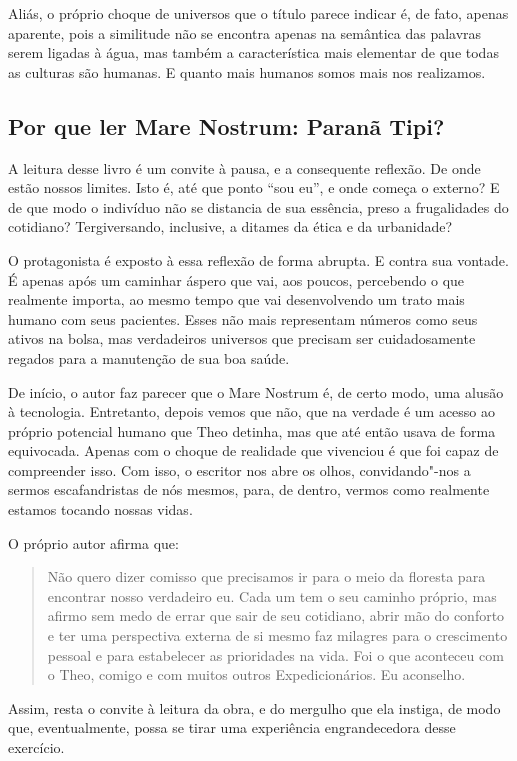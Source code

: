 \documentclass[12pt]{extarticle}
\begin{document}
Aliás, o próprio choque de universos que o título parece indicar é, de
fato, apenas aparente, pois a similitude não se encontra apenas na
semântica das palavras serem ligadas à água, mas também a característica
mais elementar de que todas as culturas são humanas. E quanto mais
humanos somos mais nos realizamos.

\subsection{Por que ler Mare Nostrum: Paranã Tipi?}

A leitura desse livro é um convite à pausa, e a consequente reflexão. De
onde estão nossos limites. Isto é, até que ponto ``sou eu'', e onde
começa o externo? E de que modo o indivíduo não se distancia de sua
essência, preso a frugalidades do cotidiano? Tergiversando, inclusive, a
ditames da ética e da urbanidade?

O protagonista é exposto à essa reflexão de forma abrupta. E contra sua
vontade. É apenas após um caminhar áspero que vai, aos poucos,
percebendo o que realmente importa, ao mesmo tempo que vai desenvolvendo
um trato mais humano com seus pacientes. Esses não mais representam
números como seus ativos na bolsa, mas verdadeiros universos que
precisam ser cuidadosamente regados para a manutenção de sua boa saúde.

De início, o autor faz parecer que o Mare Nostrum é, de certo modo, uma
alusão à tecnologia. Entretanto, depois vemos que não, que na verdade é
um acesso ao próprio potencial humano que Theo detinha, mas que até
então usava de forma equivocada. Apenas com o choque de realidade que
vivenciou é que foi capaz de compreender isso. Com isso, o escritor nos
abre os olhos, convidando"-nos a sermos escafandristas de nós mesmos,
para, de dentro, vermos como realmente estamos tocando nossas vidas.

O próprio autor afirma que:

\begin{quote}
Não quero dizer comisso que precisamos ir para o meio da floresta para
encontrar nosso verdadeiro eu. Cada um tem o seu caminho próprio, mas
afirmo sem medo de errar que sair de seu cotidiano, abrir mão do
conforto e ter uma perspectiva externa de si mesmo faz milagres para o
crescimento pessoal e para estabelecer as prioridades na vida. Foi o que
aconteceu com o Theo, comigo e com muitos outros Expedicionários. Eu
aconselho.
\end{quote}

Assim, resta o convite à leitura da obra, e do mergulho que ela instiga,
de modo que, eventualmente, possa se tirar uma experiência
engrandecedora desse exercício.
\end{document}
